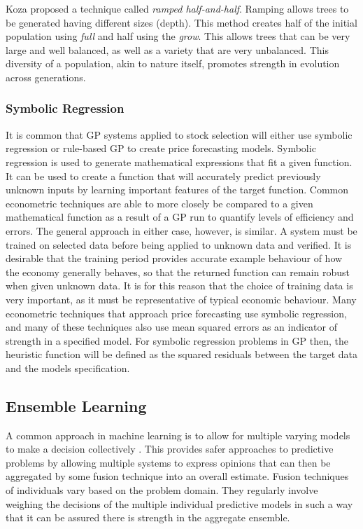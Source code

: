 \documentclass[12pt, letterpaper]{article}
\begin{document}
\textrm{ \indent Koza proposed a technique called \textit{ramped half-and-half}. Ramping allows trees to be generated having different sizes (depth). This method creates half of the initial population using \textit{full} and half using the \textit{grow}. This allows trees that can be very large and well balanced, as well as a variety that are very unbalanced. This diversity of a population, akin to nature itself, promotes strength in evolution across generations. }

\subsubsection{Symbolic Regression}
\textrm{\indent It is common that GP systems applied to stock selection will either use symbolic regression or rule-based GP to create price forecasting models. Symbolic regression is used to generate mathematical expressions that fit a given function. It can be used to create a function that will accurately predict previously unknown inputs by learning important features of the target function. Common econometric techniques are able to more closely be compared to a given mathematical function as a result of a GP run to quantify levels of efficiency and errors. The general approach in either case, however, is similar. A system must be trained on selected data before being applied to unknown data and verified. It is desirable that the training period provides accurate example behaviour of how the economy generally behaves, so that the returned function can remain robust when given unknown data. It is for this reason that the choice of training data is very important, as it must be representative of typical economic behaviour. Many econometric techniques that approach price forecasting use symbolic regression, and many of these techniques also use mean squared errors as an indicator of strength in a specified model. For symbolic regression problems in GP then, the heuristic function will be defined as the squared residuals between the target data and the models specification. }


\subsection{Ensemble Learning}

\textrm{\indent A common approach in machine learning is to allow for multiple varying models to make a decision collectively \cite{ensemble-wiki}. This provides safer approaches to predictive problems by allowing multiple systems to express opinions that can then be aggregated by some fusion technique into an overall estimate. Fusion techniques of individuals vary based on the problem domain. They regularly involve weighing the decisions of the multiple individual predictive models in such a way that it can be assured there is strength in the aggregate ensemble. }
\end{document}

